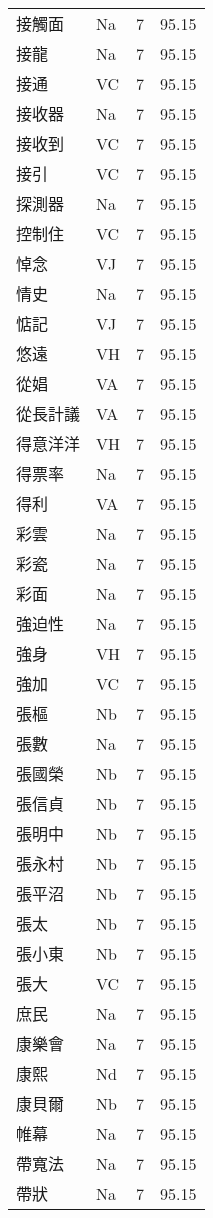 \documentclass[twocolumn]{book}
\begin{document}
\begin{supertabular}{llrr}
接觸面 & Na & 7 &  95.15\\
接龍 & Na & 7 &  95.15\\
接通 & VC & 7 &  95.15\\
接收器 & Na & 7 &  95.15\\
接收到 & VC & 7 &  95.15\\
接引 & VC & 7 &  95.15\\
探測器 & Na & 7 &  95.15\\
控制住 & VC & 7 &  95.15\\
悼念 & VJ & 7 &  95.15\\
情史 & Na & 7 &  95.15\\
惦記 & VJ & 7 &  95.15\\
悠遠 & VH & 7 &  95.15\\
從娼 & VA & 7 &  95.15\\
從長計議 & VA & 7 &  95.15\\
得意洋洋 & VH & 7 &  95.15\\
得票率 & Na & 7 &  95.15\\
得利 & VA & 7 &  95.15\\
彩雲 & Na & 7 &  95.15\\
彩瓷 & Na & 7 &  95.15\\
彩面 & Na & 7 &  95.15\\
強迫性 & Na & 7 &  95.15\\
強身 & VH & 7 &  95.15\\
強加 & VC & 7 &  95.15\\
張樞 & Nb & 7 &  95.15\\
張數 & Na & 7 &  95.15\\
張國榮 & Nb & 7 &  95.15\\
張信貞 & Nb & 7 &  95.15\\
張明中 & Nb & 7 &  95.15\\
張永村 & Nb & 7 &  95.15\\
張平沼 & Nb & 7 &  95.15\\
張太 & Nb & 7 &  95.15\\
張小東 & Nb & 7 &  95.15\\
張大 & VC & 7 &  95.15\\
庶民 & Na & 7 &  95.15\\
康樂會 & Na & 7 &  95.15\\
康熙 & Nd & 7 &  95.15\\
康貝爾 & Nb & 7 &  95.15\\
帷幕 & Na & 7 &  95.15\\
帶寬法 & Na & 7 &  95.15\\
帶狀 & Na & 7 &  95.15\\

\end{supertabular}
\end{document}
